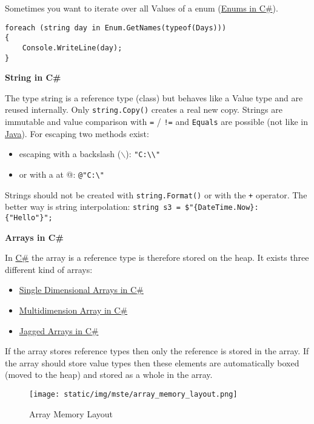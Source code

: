 \documentclass[11pt,twoside,landscape]{article}
\begin{document}
\begin{multicols}{3}
Sometimes you want to iterate over all Values of a enum (\href{../../../roam/20211006113326-enums_in_c.org}{Enums in C\#}).

\lstset{language=csharp,label= ,caption= ,captionpos=b,numbers=none}
\begin{lstlisting}
foreach (string day in Enum.GetNames(typeof(Days)))
{
    Console.WriteLine(day);
}
\end{lstlisting}

\textbf{String in C\#}

The type string is a reference type (class) but behaves like a Value type and are reused internally.
Only \texttt{string.Copy()} creates a real new copy.
Strings are immutable and value comparison with \texttt{=} / \texttt{!=} and \texttt{Equals} are possible (not like in \href{../../../roam/20201116150053-java.org}{Java}).
For escaping two methods exist:
\begin{itemize}
\item escaping with a backslash ($\backslash$): \texttt{"C:\textbackslash{}\textbackslash{}"}
\item or with a at @: \texttt{@"C:\textbackslash{}"}
\end{itemize}


Strings should not be created with \texttt{string.Format()} or with the \texttt{+} operator.
The better way is string interpolation: \texttt{string s3 = \$"\{DateTime.Now\}: \{"Hello"\}";}

\textbf{Arrays in C\#}

In \href{../../../roam/20211003114158-c.org}{C\#} the array is a reference type is therefore stored on the heap.
It exists three different kind of arrays:
\begin{itemize}
\item \href{../../../roam/20211008083138-single_dimensional_arrays_in_c.org}{Single Dimensional Arrays in C\#}
\item \href{../../../roam/20211008083241-multidimension_array_in_c.org}{Multidimension Array in C\#}
\item \href{../../../roam/20211008083300-jagged_arrays_in_c.org}{Jagged Arrays in C\#}
\end{itemize}


If the array stores reference types then only the reference is stored in the array. If the array should store value types then these elements are automatically boxed (moved to the heap) and stored as a whole in the array.

\begin{figure}[htbp]
\centering
\texttt{[image: static/img/mste/array\_memory\_layout.png]}
\caption{\label{fig:orgeaa71c0}Array Memory Layout}
\end{figure}


\end{multicols}
\end{document}
